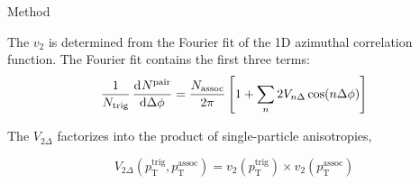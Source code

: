 \documentclass[final]{beamer}
\newlength{\onecolwid}
\newlength{\twocolwid}
\begin{document}
\begin{frame}[t]
\begin{columns}[t]
\begin{column}{\twocolwid}
\begin{columns}[t,totalwidth=\twocolwid]
\begin{column}{\onecolwid}

\end{column} %

\end{columns} %


%
%


\begin{columns}[t,totalwidth=\twocolwid] %

\begin{column}{\twocolwid} %


\begin{block}{Method}

\begin{minipage}[t]{0.5\textwidth}
The $ v_{2} $ is determined from the Fourier fit of the 1D azimuthal correlation
function. The Fourier fit contains the first three terms:\vspace{0.5in}
\begin{equation}
\frac{1}{N_{\mathrm{trig}}}\dod{N^{\mathrm{pair}}}{\Delta\phi} =
\frac{N_{\mathrm{assoc}}}{2\pi}\left[ 1 +
\sum_{n}^{}2V_{n\Delta}\cos(n\Delta\phi) \right]
\end{equation}\vspace{0.3in}

The $ V_{2\Delta} $ factorizes into the product of single-particle anisotropies,

\begin{equation}
V_{2\Delta}(p_{\mathrm{T}}^{\mathrm{trig}},p_{\mathrm{T}}^{\mathrm{assoc}}) =
v_{2}(p_{\mathrm{T}}^{\mathrm{trig}})\times
v_{2}(p_{\mathrm{T}}^{\mathrm{assoc}})
\end{equation}


\end{minipage}
\end{block}
\end{column}
\end{columns}
\end{column}
\end{columns}
\end{frame}
\end{document}
